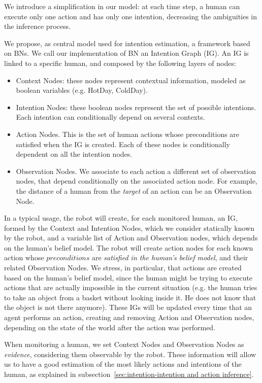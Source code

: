 We introduce a simplification in our model: at each time step, a human can execute only one action and has only one intention, decreasing the ambiguities in the inference process.

We propose, as central model used for intention estimation, a framework based on BNs. We call our implementation of BN an Intention Graph (IG).
An IG is linked to a specific human, and composed by the following layers of nodes:
\begin{itemize}
\item Context Nodes: these nodes represent contextual information, modeled as boolean variables (e.g. HotDay, ColdDay).
\item Intention Nodes: these boolean nodes represent the set of possible intentions. Each intention can conditionally depend on several contexts.
\item Action Nodes. This is the set of human actions whose preconditions are satisfied when the IG is created. Each of these nodes is conditionally dependent on all the intention nodes. 
\item Observation Nodes. We associate to each action a different set of observation nodes, that depend conditionally on the associated action node. For example, the distance of a human from the \textit{target} of an action can be an Observation Node.
\end{itemize}

In a typical usage, the robot will create, for each monitored human, an IG, formed by the Context and Intention Nodes, which we consider statically known by the robot, and a variable list of Action and Observation nodes, which depends on the human's belief model. The robot will create action nodes for each known action whose $preconditions$ are \textit{satisfied in the human's belief model}, and their related Observation Nodes. We stress, in particular, that actions are created based on the human's belief model, since the human might be trying to execute actions that are actually impossible in the current situation (e.g. the human tries to take an object from a basket without looking inside it. He does not know that the object is not there anymore).  These IGs will be updated every time that an agent performs an action, creating and removing Action and Observation nodes, depending on the state of the world after the action was performed.

When monitoring a human, we set Context Nodes and Observation Nodes as \textit{evidence}, considering them observable by the robot. These information will allow us to have a good estimation of the most likely actions and intentions of the human, as explained in subsection~\ref{sec:intention-intention and action inference}. 

